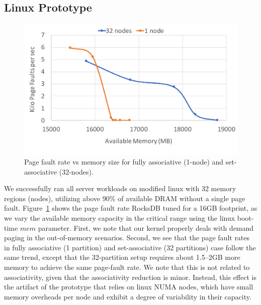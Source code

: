 \subsection{Linux Prototype}
\begin{figure}[t]
   \centering
   \includegraphics[width=1.0\columnwidth]{graphs/realhw.pdf}
   \caption{Page fault rate vs memory size for fully associative (1-node) and set-associative (32-nodes).}
   \label{fig:realhw}
\end{figure}
We successfully ran all server workloads on modified linux with 32 memory regions (nodes), utilizing above 90\% of available DRAM without a single page fault. Figure~\ref{fig:realhw} shows the page fault rate RocksDB tuned for a 16GB footprint, as we vary the available memory capacity in the critical range using the linux boot-time $mem$ parameter. First, we note that our kernel properly deals with demand paging in the out-of-memory scenarios. Second, we see that the page fault rates in fully associative (1 partition) and set-associative (32 partitions) case follow the same trend, except that the 32-partition setup requires about 1.5--2GB more memory to achieve the same page-fault rate. We note that this is not related to associativity, given that the associativity reduction is minor. Instead, this effect is the artifact of the prototype that relies on linux NUMA nodes, which have small memory overheads per node and exhibit a degree of variability in their capacity. 



